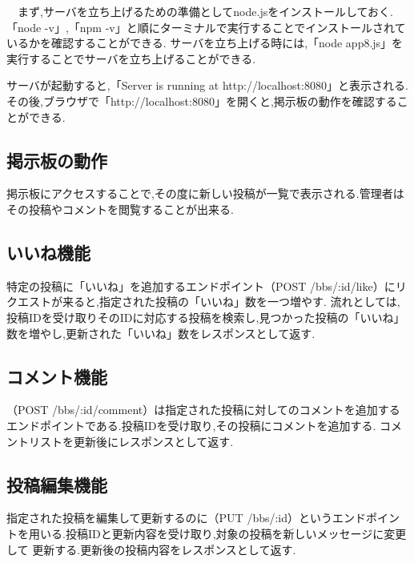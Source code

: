 \documentclass{jsarticle}
\begin{document}
　まず,サーバを立ち上げるための準備としてnode.jsをインストールしておく.「node -v」,「npm -v」と順にターミナルで実行することでインストールされているかを確認することができる.
サーバを立ち上げる時には,「node app8.js」を実行することでサーバを立ち上げることができる.\par
サーバが起動すると,「Server is running at http://localhost:8080」と表示される.その後,ブラウザで「http://localhost:8080」を開くと,掲示板の動作を確認することができる.\par

\subsection{掲示板の動作}
掲示板にアクセスすることで,その度に新しい投稿が一覧で表示される.管理者はその投稿やコメントを閲覧することが出来る.

\subsection{いいね機能}
特定の投稿に「いいね」を追加するエンドポイント（POST /bbs/:id/like）にリクエストが来ると,指定された投稿の「いいね」数を一つ増やす.
流れとしては,投稿IDを受け取りそのIDに対応する投稿を検索し,見つかった投稿の「いいね」数を増やし,更新された「いいね」数をレスポンスとして返す.

\subsection{コメント機能}
（POST /bbs/:id/comment）は指定された投稿に対してのコメントを追加するエンドポイントである.投稿IDを受け取り,その投稿にコメントを追加する.
コメントリストを更新後にレスポンスとして返す.

\subsection{投稿編集機能}
指定された投稿を編集して更新するのに（PUT /bbs/:id）というエンドポイントを用いる.投稿IDと更新内容を受け取り,対象の投稿を新しいメッセージに変更して
更新する.更新後の投稿内容をレスポンスとして返す.
\end{document}
